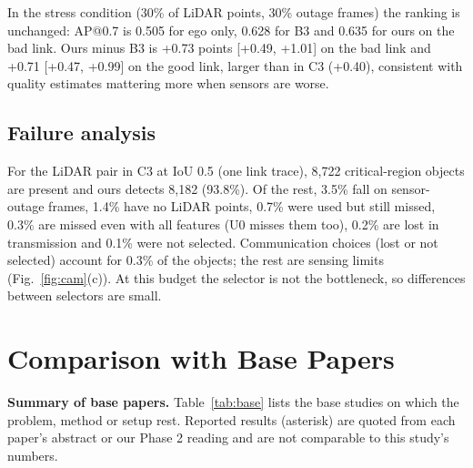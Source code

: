 \documentclass[conference]{IEEEtran}
\begin{document}


In the stress condition (30\% of LiDAR points, 30\% outage frames) the ranking is unchanged: AP@0.7 is 0.505 for ego only, 0.628 for B3 and 0.635 for ours on the bad link. Ours minus B3 is +0.73 points [+0.49, +1.01] on the bad link and +0.71 [+0.47, +0.99] on the good link, larger than in C3 (+0.40), consistent with quality estimates mattering more when sensors are worse.

\subsection{Failure analysis}
For the LiDAR pair in C3 at IoU 0.5 (one link trace), 8,722 critical-region objects are present and ours detects 8,182 (93.8\%). Of the rest, 3.5\% fall on sensor-outage frames, 1.4\% have no LiDAR points, 0.7\% were used but still missed, 0.3\% are missed even with all features (U0 misses them too), 0.2\% are lost in transmission and 0.1\% were not selected. Communication choices (lost or not selected) account for 0.3\% of the objects; the rest are sensing limits (Fig.~\ref{fig:cam}(c)). At this budget the selector is not the bottleneck, so differences between selectors are small.

\section{Comparison with Base Papers}\label{sec:base}
\textbf{Summary of base papers.} Table~\ref{tab:base} lists the base studies on which the problem, method or setup rest. Reported results (asterisk) are quoted from each paper's abstract or our Phase 2 reading and are not comparable to this study's numbers.
\end{document}

